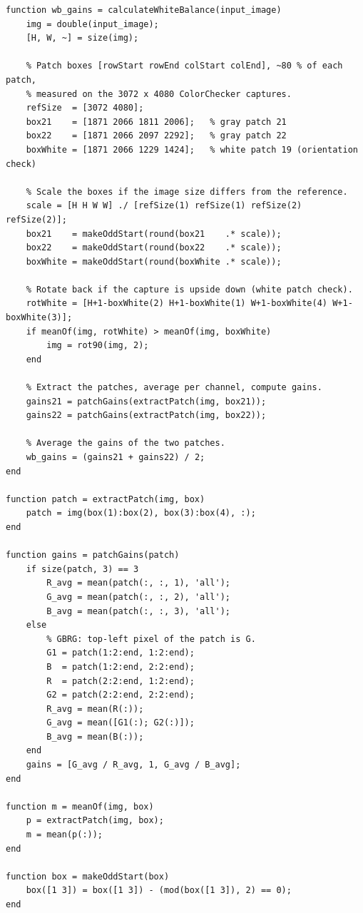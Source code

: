 \documentclass[11pt,a4paper]{article}
\begin{document}
\begin{lstlisting}
function wb_gains = calculateWhiteBalance(input_image)
    img = double(input_image);
    [H, W, ~] = size(img);

    % Patch boxes [rowStart rowEnd colStart colEnd], ~80 % of each patch,
    % measured on the 3072 x 4080 ColorChecker captures.
    refSize  = [3072 4080];
    box21    = [1871 2066 1811 2006];   % gray patch 21
    box22    = [1871 2066 2097 2292];   % gray patch 22
    boxWhite = [1871 2066 1229 1424];   % white patch 19 (orientation check)

    % Scale the boxes if the image size differs from the reference.
    scale = [H H W W] ./ [refSize(1) refSize(1) refSize(2) refSize(2)];
    box21    = makeOddStart(round(box21    .* scale));
    box22    = makeOddStart(round(box22    .* scale));
    boxWhite = makeOddStart(round(boxWhite .* scale));

    % Rotate back if the capture is upside down (white patch check).
    rotWhite = [H+1-boxWhite(2) H+1-boxWhite(1) W+1-boxWhite(4) W+1-boxWhite(3)];
    if meanOf(img, rotWhite) > meanOf(img, boxWhite)
        img = rot90(img, 2);
    end

    % Extract the patches, average per channel, compute gains.
    gains21 = patchGains(extractPatch(img, box21));
    gains22 = patchGains(extractPatch(img, box22));

    % Average the gains of the two patches.
    wb_gains = (gains21 + gains22) / 2;
end

function patch = extractPatch(img, box)
    patch = img(box(1):box(2), box(3):box(4), :);
end

function gains = patchGains(patch)
    if size(patch, 3) == 3
        R_avg = mean(patch(:, :, 1), 'all');
        G_avg = mean(patch(:, :, 2), 'all');
        B_avg = mean(patch(:, :, 3), 'all');
    else
        % GBRG: top-left pixel of the patch is G.
        G1 = patch(1:2:end, 1:2:end);
        B  = patch(1:2:end, 2:2:end);
        R  = patch(2:2:end, 1:2:end);
        G2 = patch(2:2:end, 2:2:end);
        R_avg = mean(R(:));
        G_avg = mean([G1(:); G2(:)]);
        B_avg = mean(B(:));
    end
    gains = [G_avg / R_avg, 1, G_avg / B_avg];
end

function m = meanOf(img, box)
    p = extractPatch(img, box);
    m = mean(p(:));
end

function box = makeOddStart(box)
    box([1 3]) = box([1 3]) - (mod(box([1 3]), 2) == 0);
end
\end{lstlisting}
\end{document}
